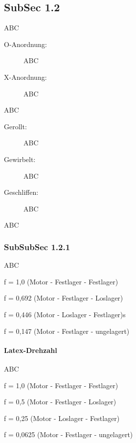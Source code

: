 \documentclass[fleqn,10pt]{techReport} %
\begin{document}
\subsection{SubSec 1.2}

ABC

\begin{description}
\item[O-Anordnung:]
ABC

\item[X-Anordnung:]
ABC
\end{description}

ABC

\begin{description}
\item[Gerollt:]
ABC

\item[Gewirbelt:]
ABC

\item[Geschliffen:]
ABC
\end{description}

ABC

\subsubsection*{SubSubSec 1.2.1}

ABC

\begin{description}
\item f = 1,0   (Motor - Festlager - Festlager)
\item f = 0,692 (Motor - Festlager - Loslager)
\item f = 0,446 (Motor - Loslager - Festlager)s
\item f = 0,147 (Motor - Festlager - ungelagert)
\end{description}

\paragraph*{Latex-Drehzahl}

ABC

\begin{description}
\item f = 1,0 (Motor - Festlager - Festlager)
\item f = 0,5 (Motor - Festlager - Loslager)
\item f = 0,25 (Motor - Loslager - Festlager)
\item f = 0,0625 (Motor - Festlager - ungelagert)
\end{description}
\end{document}
